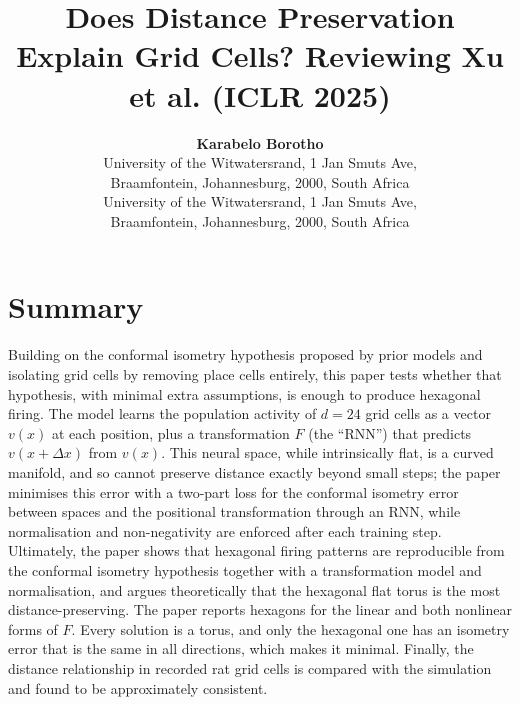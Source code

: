 \documentclass[10pt,letterpaper]{article}
\title{Does Distance Preservation Explain Grid Cells? Reviewing Xu et al. (ICLR 2025)}
\author{{\large \bf Karabelo Borotho } \\ University of the Witwatersrand, 1 Jan Smuts Ave,\\ Braamfontein, Johannesburg, 2000, South Africa
  \AND {\large \bf Nabeel Mahomed } \\ University of the Witwatersrand, 1 Jan Smuts Ave,\\ Braamfontein, Johannesburg, 2000, South Africa}
\begin{document}
\maketitle
\phantom{.}
\newpage
\phantom{.}
\newpage

\section{Summary} \label{Summary}
Building on the conformal isometry hypothesis proposed by prior models and isolating grid cells by removing place cells entirely, this paper tests whether that hypothesis, with minimal extra assumptions, is enough to produce hexagonal firing. The model learns the population activity of $d = 24$ grid cells as a vector $v(x)$ at each position, plus a transformation $F$ (the “RNN”) that predicts $v(x + \Delta x)$ from $v(x)$. This neural space, while intrinsically flat, is a curved manifold, and so cannot preserve distance exactly beyond small steps; the paper minimises this error with a two-part loss for the conformal isometry error between spaces and the positional transformation through an RNN, while normalisation and non-negativity are enforced after each training step. Ultimately, the paper shows that hexagonal firing patterns are reproducible from the conformal isometry hypothesis together with a transformation model and normalisation, and argues theoretically that the hexagonal flat torus is the most distance-preserving. The paper reports hexagons for the linear and both nonlinear forms of $F$. Every solution is a torus, and only the hexagonal one has an isometry error that is the same in all directions, which makes it minimal. Finally, the distance relationship in recorded rat grid cells \citep{gardner2021toroidal} is compared with the simulation and found to be approximately consistent. 
\end{document}
